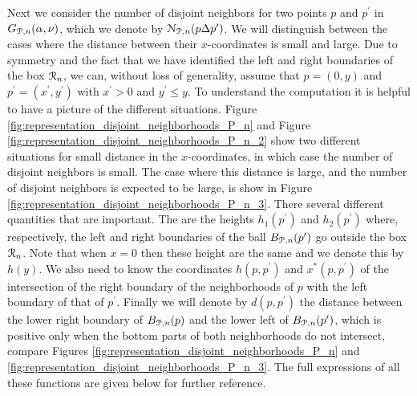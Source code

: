 \begin{appendices}
Next we consider the number of disjoint neighbors for two points $p$ and $p^\prime$ in $G_{{\mathcal P},n}(\alpha,\nu)$, which we denote by ${\mathcal N}_{{\mathcal P},n}(p\Delta p^\prime)$. We will distinguish between the cases where the distance between their $x$-coordinates is small and large. Due to symmetry and the fact that we have identified the left and right boundaries of the box ${\mathcal R}_n$, we can, without loss of generality, assume that $p = (0,y)$ and $p^\prime = (x^\prime,y^\prime)$ with $x^\prime > 0$ and $y^\prime \le y$. To understand the computation it is helpful to have a picture of the different situations. Figure \ref{fig:representation_disjoint_neighborhoods_P_n} and Figure \ref{fig:representation_disjoint_neighborhoods_P_n_2} show two different situations for small distance in the $x$-coordinates, in which case the number of disjoint neighbors is small. The case where this distance is large, and the number of disjoint neighbors is expected to be large, is show in Figure \ref{fig:representation_disjoint_neighborhoods_P_n_3}. There several different quantities that are important. The are the heights $h_1(p^\prime)$ and $h_2(p^\prime)$ where, respectively, the left and right boundaries of the ball $B_{{\mathcal P},n}(p^\prime)$ go outside the box ${\mathcal R}_n$. Note that when $x = 0$ then these height are the same and we denote this by $h(y)$. We also need to know the coordinates $h(p,p^\prime)$ and $x^\ast(p,p^\prime)$ of the intersection of the right boundary of the neighborhoods of $p$ with the left boundary of that of $p^\prime$. Finally we will denote by $d(p,p^\prime)$ the distance between the lower right boundary of $B_{{\mathcal P},n}(p)$ and the lower left of $B_{{\mathcal P},n}(p^\prime)$, which is positive only when the bottom parts of both neighborhoods do not intersect, compare Figures \ref{fig:representation_disjoint_neighborhoods_P_n} and \ref{fig:representation_disjoint_neighborhoods_P_n_3}. The full expressions of all these functions are given below for further reference.


\end{appendices}
